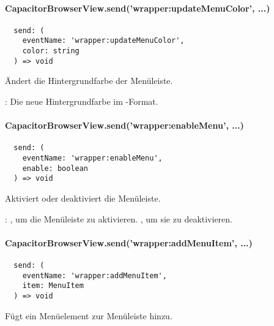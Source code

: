 
\paragraph{CapacitorBrowserView.send('wrapper:updateMenuColor', ...)}

\begin{verbatim}
  send: (
    eventName: 'wrapper:updateMenuColor',
    color: string
  ) => void
\end{verbatim}

Ändert die Hintergrundfarbe der Menüleiste.

\begin{arguments}
  \item {}: Die neue Hintergrundfarbe im -Format.
\end{arguments}


\newpage

\paragraph{CapacitorBrowserView.send('wrapper:enableMenu', ...)}

\begin{verbatim}
  send: (
    eventName: 'wrapper:enableMenu',
    enable: boolean
  ) => void
\end{verbatim}

Aktiviert oder deaktiviert die Menüleiste.

\begin{arguments}
  \item {}: , um die Menüleiste zu aktivieren. , um sie zu deaktivieren.
\end{arguments}


\paragraph{CapacitorBrowserView.send('wrapper:addMenuItem', ...)}

\begin{verbatim}
  send: (
    eventName: 'wrapper:addMenuItem',
    item: MenuItem
  ) => void
\end{verbatim}

Fügt ein Menüelement zur Menüleiste hinzu.

